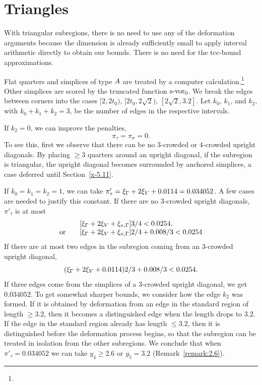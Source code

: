 \section{Triangles}

With triangular subregions, there is no need to use any of the
deformation arguments because the dimension is already sufficiently
small to apply interval arithmetic directly to obtain our bounds.
There is no need for the tcc-bound approximations.

Flat quarters and simplices of type $A$ are treated by a computer
calculation.\footnote{} %
Other simplices are scored by the truncated function
$\operatorname{s-vor}_0$. We break the edges between corners into the cases
    $[2,2t_0)$, $[2t_0,2\sqrt{2})$, $[2\sqrt{2},3.2]$.
Let $k_0$, $k_1$, and $k_2$, with $k_0+k_1+k_2=3$, be the number
of edges  in the respective intervals.

If $k_2=0$, we can improve the penalties,
    $$\pi_\tau = \pi_\sigma=0.$$
To see this, first we observe that there can be no $3$-crowded or
$4$-crowded upright diagonals. By placing $\ge3$ quarters around
an upright diagonal, if the subregion is triangular, the upright
diagonal becomes surrounded by anchored simplices, a case deferred
until Section~\ref{x-5.11}.

If $k_0=k_1=k_2=1$, we can take $\pi'_\tau=
\xi_\Gamma+2\xi_V+0.0114=0.034052$. A few cases are needed to justify
this constant. If there are no $3$-crowded upright diagonals,
$\pi'_\tau$ is at most
    $$
    \begin{array}{lll}
    &[\xi_\Gamma + 2 \xi_V +\xi_{\kappa,\Gamma} ]3/4 < 0.0254,\\
    \hbox{or\quad }&[\xi_\Gamma+2\xi_V+\xi_{\kappa,\Gamma}]2/4 + 0.008/3 < 0.0254
    \end{array}
    $$
If there are at most two edges in the subregion coming from an
$3$-crowded upright diagonal,
    $$(\xi_\Gamma+2\xi_V+0.0114)2/3 + 0.008/3 < 0.0254.$$
If three edges come from the simplices of a $3$-crowded upright
diagonal, we get $0.034052$. To get somewhat sharper bounds, we
consider how the edge $k_2$ was formed.  If it is obtained by
deformation from an edge in the standard region of length
$\ge3.2$, then it becomes a distinguished edge when the length
drops to $3.2$.  If the edge in the standard region already has
length $\le3.2$, then it is distinguished before the deformation
process begins, so that the subregion can be treated in isolation
from the other subregions. We conclude that when
$\pi'_\tau=0.034052$ we can take $y_4\ge2.6$ or $y_5=3.2$
(Remark~\ref{remark:2.6}).

